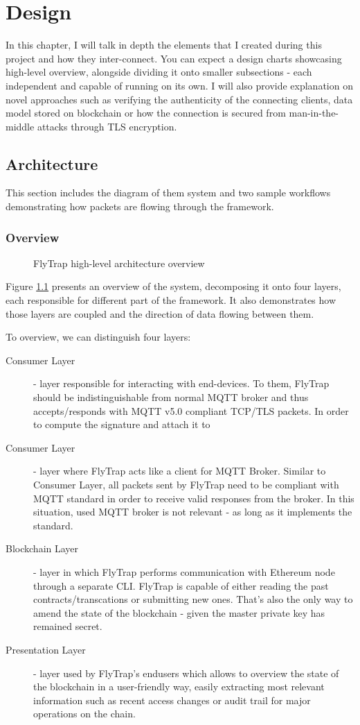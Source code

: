 \chapter{Design\label{chap:design}}
In this chapter, I will talk in depth the elements that I created during this project and how they inter-connect. You can expect a design charts showcasing high-level overview, alongside dividing it onto smaller subsections - each independent and capable of running on its own. I will also provide explanation on novel approaches such as verifying the authenticity of the connecting clients, data model stored on blockchain or how the connection is secured from man-in-the-middle attacks through TLS encryption.

\section{Architecture}
This section includes the diagram of them system and two sample workflows demonstrating how packets are flowing through the framework.
\subsection{Overview}
\begin{figure}[h]
    \centering
    \caption{FlyTrap high-level architecture overview}
    \label{fig:flytrap}
\end{figure}
Figure \ref{fig:flytrap} presents an overview of the system, decomposing it onto four layers, each responsible for different part of the framework. It also demonstrates how those layers are coupled and the direction of data flowing between them.

To overview, we can distinguish four layers:
\begin{description}
    \item[Consumer Layer] - layer responsible for interacting with end-devices. To them, FlyTrap should be indistinguishable from normal MQTT broker and thus accepts/responds with MQTT v5.0 compliant TCP/TLS packets. In order to compute the signature and attach it to 
    \item[Consumer Layer] - layer where FlyTrap acts like a client for MQTT Broker. Similar to Consumer Layer, all packets sent by FlyTrap need to be compliant with MQTT standard in order to receive valid responses from the broker. In this situation, used MQTT broker is not relevant - as long as it implements the standard.
    \item[Blockchain Layer] - layer in which FlyTrap performs communication with Ethereum node through a separate CLI. FlyTrap is capable of either reading the past contracts/transcations or submitting new ones. That's also the only way to amend the state of the blockchain - given the master private key has remained secret.
    \item[Presentation Layer] - layer used by FlyTrap's endusers which allows to overview the state of the blockchain in a user-friendly way, easily extracting most relevant information such as recent access changes or audit trail for major operations on the chain.
\end{description}


